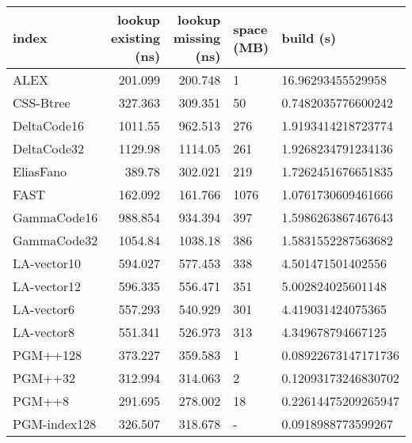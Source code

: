 \begin{tabular}{lrrll}
\hline
 index             &   lookup existing (ns) &   lookup missing (ns) & space (MB)   & build (s)             \\
\hline
 ALEX              &                201.099 &               200.748 & 1            & 16.96293455529958     \\
 CSS-Btree         &                327.363 &               309.351 & 50           & 0.7482035776600242    \\
 DeltaCode16       &               1011.55  &               962.513 & 276          & 1.9193414218723774    \\
 DeltaCode32       &               1129.98  &              1114.05  & 261          & 1.9268234791234136    \\
 EliasFano         &                389.78  &               302.021 & 219          & 1.7262451676651835    \\
 FAST              &                162.092 &               161.766 & 1076         & 1.0761730609461666    \\
 GammaCode16       &                988.854 &               934.394 & 397          & 1.5986263867467643    \\
 GammaCode32       &               1054.84  &              1038.18  & 386          & 1.5831552287563682    \\
 LA-vector10       &                594.027 &               577.453 & 338          & 4.501471501402556     \\
 LA-vector12       &                596.335 &               556.471 & 351          & 5.002824025601148     \\
 LA-vector6        &                557.293 &               540.929 & 301          & 4.419031424075365     \\
 LA-vector8        &                551.341 &               526.973 & 313          & 4.349678794667125     \\
 PGM++128          &                373.227 &               359.583 & 1            & 0.08922673147171736   \\
 PGM++32           &                312.994 &               314.063 & 2            & 0.12093173246830702   \\
 PGM++8            &                291.695 &               278.002 & 18           & 0.22614475209265947   \\
 PGM-index128      &                326.507 &               318.678 & -            & 0.0918988773599267    \\

\end{tabular}
